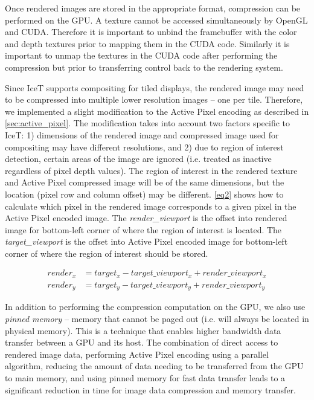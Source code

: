 \documentclass{vgtc}                          %
\begin{document}
Once rendered images are stored in the appropriate format, compression can be performed on the GPU. A texture cannot be accessed simultaneously by OpenGL and CUDA. Therefore it is important to unbind the framebuffer with the color and depth textures prior to mapping them in the CUDA code. Similarly it is important to unmap the textures in the CUDA code after performing the compression but prior to transferring control back to the rendering system.

Since IceT supports compositing for tiled displays, the rendered image may need to be compressed into multiple lower resolution images -- one per tile. Therefore, we implemented a slight modification to the Active Pixel encoding as described in \autoref{sec:active_pixel}. The modification takes into account two factors specific to IceT: 1) dimensions of the rendered image and compressed image used for compositing may have different resolutions, and 2) due to region of interest detection, certain areas of the image are ignored (i.e. treated as inactive regardless of pixel depth values). The region of interest in the rendered texture and Active Pixel compressed image will be of the same dimensions, but the location (pixel row and column offset) may be different. \autoref{eq2} shows how to calculate which pixel in the rendered image corresponds to a given pixel in the Active Pixel encoded image. The \textit{render\_viewport} is the offset into rendered image for bottom-left corner of where the region of interest is located. The \textit{target\_viewport} is the offset into Active Pixel encoded image for bottom-left corner of where the region of interest should be stored.

\begin{align}
  render_x &= target_x - target\_viewport_x + render\_viewport_x \nonumber \\
  render_y &= target_y - target\_viewport_y + render\_viewport_y \label{eq2}
\end{align}

In addition to performing the compression computation on the GPU, we also use \textit{pinned memory} -- memory that cannot be paged out (i.e. will always be located in physical memory). This is a technique that enables higher bandwidth data transfer between a GPU and its host. The combination of direct access to rendered image data, performing Active Pixel encoding using a parallel algorithm, reducing the amount of data needing to be transferred from the GPU to main memory, and using pinned memory for fast data transfer leads to a significant reduction in time for image data compression and memory transfer.
\end{document}

